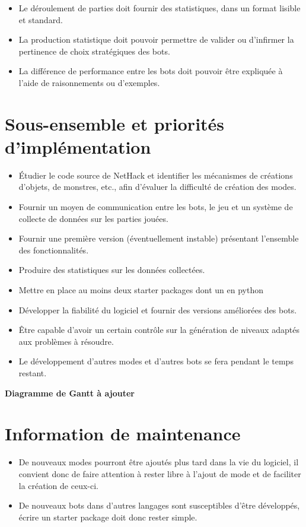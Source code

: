 \documentclass[12pt]{article}
\begin{document}
\begin{itemize}
\item
  Le déroulement de parties doit fournir des statistiques, dans un
  format lisible et standard.
\item
  La production statistique doit pouvoir permettre de valider ou
  d'infirmer la pertinence de choix stratégiques des bots.
\item
  La différence de performance entre les bots doit pouvoir être
  expliquée à l'aide de raisonnements ou d'exemples.
\end{itemize}

\section{Sous-ensemble et priorités d'implémentation}

\begin{itemize}
\item
  Étudier le code source de NetHack et identifier les mécanismes de
  créations d'objets, de monstres, etc., afin d'évaluer la difficulté de
  création des modes.
\item
  Fournir un moyen de communication entre les bots, le jeu et un système
  de collecte de données sur les parties jouées.
\item
  Fournir une première version (éventuellement instable) présentant
  l'ensemble des fonctionnalités.
\item
  Produire des statistiques sur les données collectées.
\item
  Mettre en place au moins deux starter packages dont un en python
\item
  Développer la fiabilité du logiciel et fournir des versions améliorées
  des bots.
\item
  Être capable d'avoir un certain contrôle sur la génération de niveaux
  adaptés aux problèmes à résoudre.
\item
  Le développement d'autres modes et d'autres bots se fera pendant le
  temps restant.
\end{itemize}

\textbf{Diagramme de Gantt à ajouter}

\section{Information de maintenance}

\begin{itemize}
\item
  De nouveaux modes pourront être ajoutés plus tard dans la vie du
  logiciel, il convient donc de faire attention à rester libre à l'ajout
  de mode et de faciliter la création de ceux-ci.
\item
  De nouveaux bots dans d'autres langages sont susceptibles d'être
  développés, écrire un starter package doit donc rester simple.
\end{itemize}
\end{document}
